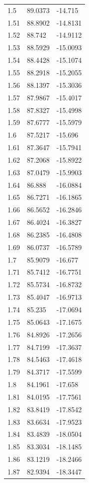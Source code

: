\begin{table}
\begin{tabular}{lll}
1.5 & 89.0373 & -14.715 \\
1.51 & 88.8902 & -14.8131 \\
1.52 & 88.742 & -14.9112 \\
1.53 & 88.5929 & -15.0093 \\
1.54 & 88.4428 & -15.1074 \\
1.55 & 88.2918 & -15.2055 \\
1.56 & 88.1397 & -15.3036 \\
1.57 & 87.9867 & -15.4017 \\
1.58 & 87.8327 & -15.4998 \\
1.59 & 87.6777 & -15.5979 \\
1.6 & 87.5217 & -15.696 \\
1.61 & 87.3647 & -15.7941 \\
1.62 & 87.2068 & -15.8922 \\
1.63 & 87.0479 & -15.9903 \\
1.64 & 86.888 & -16.0884 \\
1.65 & 86.7271 & -16.1865 \\
1.66 & 86.5652 & -16.2846 \\
1.67 & 86.4024 & -16.3827 \\
1.68 & 86.2385 & -16.4808 \\
1.69 & 86.0737 & -16.5789 \\
1.7 & 85.9079 & -16.677 \\
1.71 & 85.7412 & -16.7751 \\
1.72 & 85.5734 & -16.8732 \\
1.73 & 85.4047 & -16.9713 \\
1.74 & 85.235 & -17.0694 \\
1.75 & 85.0643 & -17.1675 \\
1.76 & 84.8926 & -17.2656 \\
1.77 & 84.7199 & -17.3637 \\
1.78 & 84.5463 & -17.4618 \\
1.79 & 84.3717 & -17.5599 \\
1.8 & 84.1961 & -17.658 \\
1.81 & 84.0195 & -17.7561 \\
1.82 & 83.8419 & -17.8542 \\
1.83 & 83.6634 & -17.9523 \\
1.84 & 83.4839 & -18.0504 \\
1.85 & 83.3034 & -18.1485 \\
1.86 & 83.1219 & -18.2466 \\
1.87 & 82.9394 & -18.3447 \\

\end{tabular}
\end{table}

